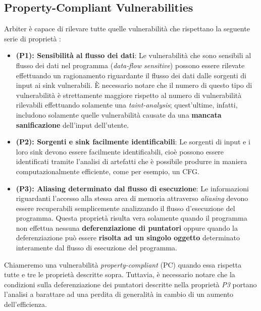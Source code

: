 \documentclass[../main.tex]{subfiles}
\begin{document}
\subsection{Property-Compliant Vulnerabilities}
Arbiter è capace di rilevare tutte quelle vulnerabilità che rispettano la seguente serie di proprietà \cite{Arbier}:
\begin{itemize}
    \item \textbf{(P1): Sensibilità al flusso dei dati}: Le vulnerabilità che sono sensibili al flusso dei dati nel programma (\textit{data-flow sensitive}) possono essere rilevate effettuando
    un ragionamento riguardante il flusso dei dati dalle sorgenti di input ai sink vulnerabili. È necessario notare che il numero di questo tipo di vulnerabilità è strettamente maggiore rispetto al numero di vulnerabilità
    rilevabili effettuando solamente una \textit{taint-analysis}; quest'ultime, infatti, includono solamente quelle vulnerabilità causate da una \textbf{mancata sanificazione} dell'input dell'utente.
    \item \textbf{(P2): Sorgenti e sink facilmente identificabili}: Le sorgenti di input e i loro sink devono essere facilmente identificabili, cioè possono essere identificati tramite l'analisi di artefatti che è possibile
    produrre in maniera computazionalmente efficiente, come per esempio, un CFG.
    \item \textbf{(P3): Aliasing determinato dal flusso di esecuzione}: Le informazioni riguardanti l'accesso alla stessa area di memoria attraverso \textit{aliasing} devono essere recuperabili semplicemente analizzando il flusso d'esecuzione del programma.
    Questa proprietà risulta vera solamente quando il programma non effettua nessuna \textbf{deferenziazione di puntatori} oppure quando la deferenziazione può essere \textbf{risolta ad un singolo oggetto} determinato interamente dal flusso di esecuzione del programma.
\end{itemize}
Chiameremo una vulnerabilità \textit{property-compliant} (PC) quando essa rispetta tutte e tre le proprietà descritte sopra. Tuttavia, è necessario notare che la condizioni sulla deferenziazione dei puntatori descritte nella proprietà \textit{P3} portano
l'analisi a barattare ad una perdita di generalità in cambio di un aumento dell'efficienza.
\end{document}
